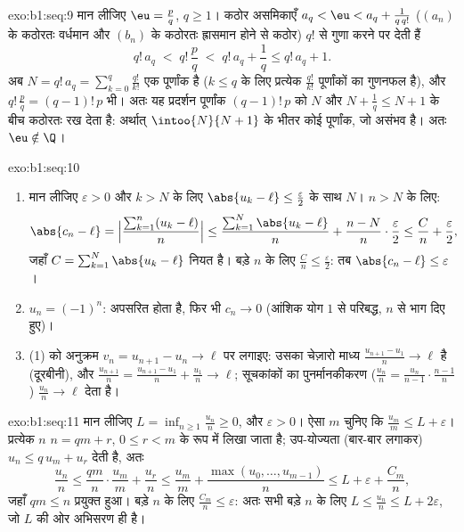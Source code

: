 \begin{solution}{exo:b1:seq:9}
मान लीजिए $\eu = \frac pq$, $q \geq 1$। कठोर असमिकाएँ $a_q < \eu < a_q +
\frac{1}{q\,q!}$ ($(a_n)$ के कठोरतः वर्धमान और $(b_n)$ के कठोरतः ह्रासमान
होने से कठोर) $q!$ से गुणा करने पर देती हैं
\[
q!\,a_q \;<\; q!\,\frac pq \;<\; q!\,a_q + \frac 1q \leq q!\,a_q + 1.
\]
अब $N = q!\,a_q = \sum_{k=0}^{q} \frac{q!}{k!}$ एक पूर्णांक है ($k \leq q$
के लिए प्रत्येक $\frac{q!}{k!}$ पूर्णांकों का गुणनफल है), और $q!\,\frac pq =
(q-1)!\,p$ भी। अतः यह प्रदर्शन पूर्णांक $(q-1)!\,p$ को $N$ और $N + \frac 1q
\leq N + 1$ के बीच कठोरतः रख देता है: अर्थात् $\intoo{N}{N+1}$ के भीतर कोई
पूर्णांक, जो असंभव है। अतः $\eu \notin \Q$।
\end{solution}

\begin{solution}{exo:b1:seq:10}
\begin{enumerate}
  \item मान लीजिए $\varepsilon > 0$ और $k > N$ के लिए $\abs{u_k - \ell} \leq
  \frac{\varepsilon}{2}$ के साथ $N$। $n > N$ के लिए:
        \[
        \abs{c_n - \ell}
        = \Bigl|\frac{\sum_{k=1}^{n}(u_k - \ell)}{n}\Bigr|
        \leq \frac{\sum_{k=1}^{N} \abs{u_k - \ell}}{n}
        + \frac{n - N}{n}\cdot\frac{\varepsilon}{2}
        \leq \frac{C}{n} + \frac{\varepsilon}{2},
        \]
        जहाँ $C = \sum_{k=1}^N \abs{u_k - \ell}$ नियत है। बड़े $n$ के लिए
        $\frac Cn \leq \frac\varepsilon2$: तब $\abs{c_n - \ell} \leq
        \varepsilon$।
  \item $u_n = (-1)^n$: अपसरित होता है, फिर भी $c_n \to 0$ (आंशिक योग $1$ से
  परिबद्ध, $n$ से भाग दिए हुए)।
  \item (1) को अनुक्रम $v_n = u_{n+1} - u_n \to \ell$ पर लगाइए: उसका चेज़ारो
  माध्य $\frac{u_{n+1} - u_1}{n} \to \ell$ है (दूरबीनी), और
  $\frac{u_{n+1}}{n} = \frac{u_{n+1} - u_1}{n} + \frac{u_1}{n} \to \ell$;
  सूचकांकों का पुनर्मानकीकरण ($\frac{u_n}{n} =
  \frac{u_n}{n-1}\cdot\frac{n-1}{n}$) $\frac{u_n}{n} \to \ell$ देता है।
\end{enumerate}
\end{solution}

\begin{solution}{exo:b1:seq:11}
मान लीजिए $L = \inf_{n \geq 1} \frac{u_n}{n} \geq 0$, और $\varepsilon > 0$।
ऐसा $m$ चुनिए कि $\frac{u_m}{m} \leq L + \varepsilon$। प्रत्येक $n$ $n = qm
+ r$, $0 \leq r < m$ के रूप में लिखा जाता है; उप-योज्यता (बार-बार लगाकर)
$u_n \leq q\,u_m + u_r$ देती है, अतः
\[
\frac{u_n}{n} \leq \frac{q m}{n}\cdot\frac{u_m}{m} + \frac{u_r}{n}
\leq \frac{u_m}{m} + \frac{\max(u_0, \dots, u_{m-1})}{n}
\leq L + \varepsilon + \frac{C_m}{n},
\]
जहाँ $qm \leq n$ प्रयुक्त हुआ। बड़े $n$ के लिए $\frac{C_m}{n} \leq
\varepsilon$: अतः सभी बड़े $n$ के लिए $L \leq \frac{u_n}{n} \leq L +
2\varepsilon$, जो $L$ की ओर अभिसरण ही है।
\end{solution}

